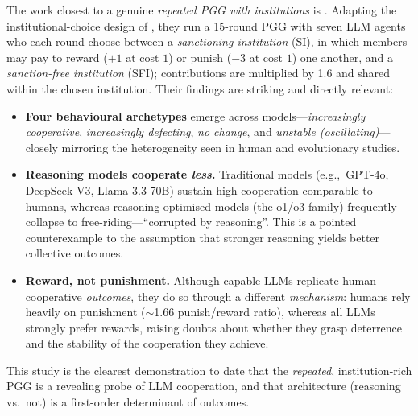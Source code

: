 \documentclass[11pt,a4paper]{article}
\newcommand{\eg}{e.g.,\ }
\begin{document}
The work closest to a genuine \emph{repeated PGG with institutions} is
\citet{guzman2025corrupted}. Adapting the institutional-choice design of
\citet{gurerk2006competitive}, they run a 15-round PGG with seven LLM agents who
each round choose between a \emph{sanctioning institution} (SI), in which members
may pay to reward (\(+1\) at cost \(1\)) or punish (\(-3\) at cost \(1\)) one
another, and a \emph{sanction-free institution} (SFI); contributions are
multiplied by 1.6 and shared within the chosen institution. Their findings are
striking and directly relevant:
\begin{itemize}
  \item \textbf{Four behavioural archetypes} emerge across models---\emph{increasingly
  cooperative}, \emph{increasingly defecting}, \emph{no change}, and
  \emph{unstable (oscillating)}---closely mirroring the heterogeneity seen in
  human and evolutionary studies.
  \item \textbf{Reasoning models cooperate \emph{less}.} Traditional models
  (\eg GPT-4o, DeepSeek-V3, Llama-3.3-70B) sustain high cooperation comparable to
  humans, whereas reasoning-optimised models (the o1/o3 family) frequently
  collapse to free-riding---``corrupted by reasoning''. This is a pointed
  counterexample to the assumption that stronger reasoning yields better
  collective outcomes.
  \item \textbf{Reward, not punishment.} Although capable LLMs replicate human
  cooperative \emph{outcomes}, they do so through a different \emph{mechanism}:
  humans rely heavily on punishment ($\sim$1.66 punish/reward ratio), whereas all
  LLMs strongly prefer rewards, raising doubts about whether they grasp deterrence
  and the stability of the cooperation they achieve.
\end{itemize}
This study is the clearest demonstration to date that the \emph{repeated},
institution-rich PGG is a revealing probe of LLM cooperation, and that
architecture (reasoning vs.\ not) is a first-order determinant of outcomes.
\end{document}
